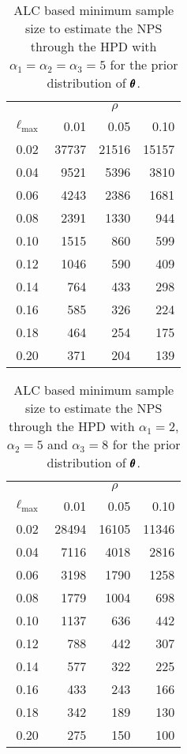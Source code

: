 \documentclass[12pt,a4paper]{article}%
\newcommand*{\bff}[1]{\ifmmode\pmb{#1}\else\textbf{#1}\fi}
\begin{document}
\begin{table}
\begin{center}
\caption{ALC based minimum sample size to estimate the NPS through the HPD with $\alpha_1=\alpha_2=\alpha_3=5$ for the prior distribution of $\bff{\theta}$.}\label{min-n-cen2}
\begin{tabular}{crrr}
\hline
 & \multicolumn{3}{c}{$\rho$} \\\cline{2-4}
$\ell_{\text{max}}$ & 0.01 & 0.05 & 0.10\\\hline
0.02 & 37737 & 21516 & 15157\\
0.04 & 9521  & 5396  & 3810 \\
0.06 & 4243  & 2386  & 1681 \\
0.08 & 2391  & 1330  & 944  \\
0.10 & 1515  & 860   & 599  \\
0.12 & 1046  & 590   & 409  \\
0.14 & 764   & 433   & 298  \\
0.16 & 585   & 326   & 224  \\
0.18 & 464   & 254   & 175  \\
0.20 & 371   & 204   & 139  \\
\hline
\end{tabular}
\end{center}
\end{table}

\begin{table}
\begin{center}
\caption{ALC based minimum sample size to estimate the NPS through the HPD with $\alpha_1=2$, $\alpha_2=5$ and $\alpha_3=8$ for the prior distribution of $\bff{\theta}$.}\label{min-n-cen3}
\begin{tabular}{crrr}
\hline
 & \multicolumn{3}{c}{$\rho$} \\\cline{2-4}
$\ell_{\text{max}}$ & 0.01 & 0.05 & 0.10\\\hline
0.02 & 28494 & 16105 & 11346\\
0.04 & 7116  & 4018  & 2816 \\
0.06 & 3198  & 1790  & 1258 \\
0.08 & 1779  & 1004  & 698  \\
0.10 & 1137  & 636   & 442  \\
0.12 & 788   & 442   & 307  \\
0.14 & 577   & 322   & 225  \\
0.16 & 433   & 243   & 166  \\
0.18 & 342   & 189   & 130  \\
0.20 & 275   & 150   & 100  \\
\hline
\end{tabular}
\end{center}
\end{table}
\end{document}
